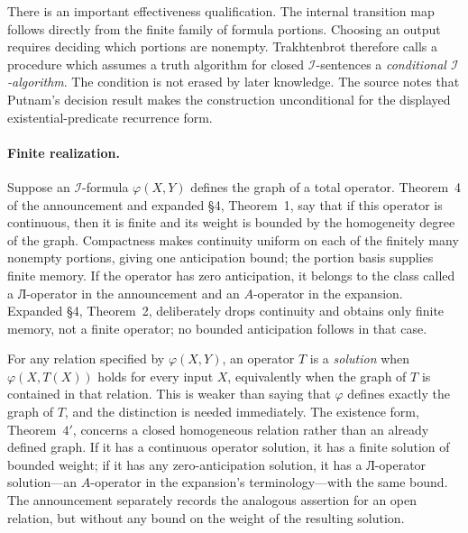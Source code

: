 There is an important effectiveness qualification.  The internal transition
map follows directly from the finite family of formula portions.  Choosing an
output requires deciding which portions are nonempty.  Trakhtenbrot therefore
calls a procedure which assumes a truth algorithm for closed
\(\mathcal I\)-sentences a \emph{conditional \(\mathcal I\)-algorithm}.  The
condition is not erased by later knowledge.  The source notes that Putnam's
decision result makes the construction unconditional for the displayed
existential-predicate recurrence form.

\paragraph{Finite realization.}
Suppose an \(\mathcal I\)-formula \(\varphi(X,Y)\) defines the graph of a total
operator.  Theorem~4 of the announcement and expanded \S4, Theorem~1, say that
if this operator is continuous, then it is finite and its weight is bounded by
the homogeneity degree of the graph.  Compactness makes continuity uniform on
each of the finitely many nonempty portions, giving one anticipation bound;
the portion basis supplies finite memory.  If the operator has zero
anticipation, it belongs to the class called a Л-operator in the announcement
and an \(A\)-operator in the expansion.  Expanded \S4, Theorem~2, deliberately
drops continuity and obtains only finite memory, not a finite operator; no
bounded anticipation follows in that case.

For any relation specified by \(\varphi(X,Y)\), an operator \(T\) is a
\emph{solution} when \(\varphi(X,T(X))\) holds for every input \(X\), equivalently
when the graph of \(T\) is contained in that relation.  This is weaker than
saying that \(\varphi\) defines exactly the graph of \(T\), and the distinction
is needed immediately.  The existence form, Theorem~\(4'\), concerns a closed
homogeneous relation rather than an already defined graph.  If it has a
continuous operator solution, it has a finite solution of bounded weight; if
it has any zero-anticipation solution, it has a Л-operator solution---an
\(A\)-operator in the expansion's terminology---with the same bound.  The
announcement separately records the analogous assertion for an open relation,
but without any bound on the weight of the resulting solution.

